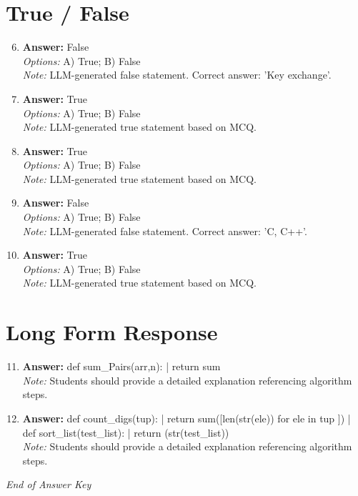 \documentclass[12pt]{article}
\begin{document}
\section*{True / False}
\begin{enumerate}[label=\arabic*.]
\setcounter{enumi}{5}
\item \textbf{Answer:} False
\\ \textit{Options:} A) True; B) False
\\ \textit{Note:} LLM-generated false statement. Correct answer: 'Key exchange'.
\item \textbf{Answer:} True
\\ \textit{Options:} A) True; B) False
\\ \textit{Note:} LLM-generated true statement based on MCQ.
\item \textbf{Answer:} True
\\ \textit{Options:} A) True; B) False
\\ \textit{Note:} LLM-generated true statement based on MCQ.
\item \textbf{Answer:} False
\\ \textit{Options:} A) True; B) False
\\ \textit{Note:} LLM-generated false statement. Correct answer: 'C, C++'.
\item \textbf{Answer:} True
\\ \textit{Options:} A) True; B) False
\\ \textit{Note:} LLM-generated true statement based on MCQ.
\end{enumerate}

\section*{Long Form Response}
\begin{enumerate}[label=\arabic*.]
\setcounter{enumi}{10}
\item \textbf{Answer:} def sum\_Pairs(arr,n): | return sum
\\ \textit{Note:} Students should provide a detailed explanation referencing algorithm steps.
\item \textbf{Answer:} def count\_digs(tup): | return sum([len(str(ele)) for ele in tup ]) | def sort\_list(test\_list): | return (str(test\_list))
\\ \textit{Note:} Students should provide a detailed explanation referencing algorithm steps.
\end{enumerate}

\vfill
\noindent\textit{End of Answer Key}
\end{document}
